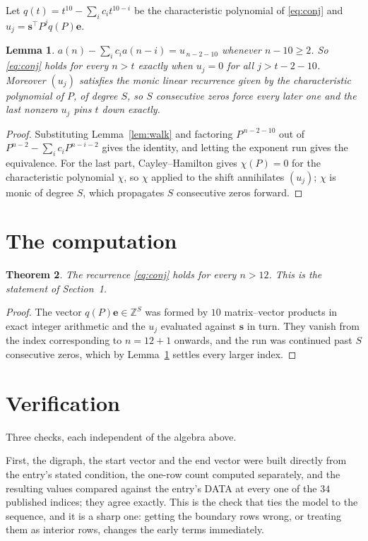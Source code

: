 \documentclass[11pt,a4paper]{article}
\theoremstyle{plain}
\newtheorem{theorem}{Theorem}
\newtheorem{lemma}[theorem]{Lemma}
\theoremstyle{definition}
\begin{document}
Let $q(t)=t^{10}-\sum_i c_i t^{10-i}$ be the characteristic polynomial of
\eqref{eq:conj} and $u_j=\mathbf{s}^{\!\top}P^{j}q(P)\mathbf{e}$.

\begin{lemma}\label{lem:crit}
$a(n)-\sum_i c_i a(n-i)=u_{\,n-2-10}$ whenever $n-10\ge2$. So \eqref{eq:conj}
holds for every $n>t$ exactly when $u_j=0$ for all $j>t-2-10$. Moreover $(u_j)$
satisfies the monic linear recurrence given by the characteristic polynomial of $P$, of
degree $S$, so $S$ consecutive zeros force every later one and the last nonzero $u_j$ pins
$t$ down exactly.
\end{lemma}

\begin{proof}
Substituting Lemma~\ref{lem:walk} and factoring $P^{\,n-2-10}$ out of
$P^{n-2}-\sum_i c_i P^{n-i-2}$ gives the identity, and letting the exponent run gives the
equivalence. For the last part, Cayley--Hamilton gives $\chi(P)=0$ for the characteristic
polynomial $\chi$, so $\chi$ applied to the shift annihilates $(u_j)$; $\chi$ is monic of
degree $S$, which propagates $S$ consecutive zeros forward.
\end{proof}

\section{The computation}

\begin{theorem}
The recurrence \eqref{eq:conj} holds for every $n>12$. This is the statement of
Section~1.
\end{theorem}

\begin{proof}
The vector $q(P)\mathbf{e}\in\mathbb{Z}^{S}$ was formed by $10$ matrix--vector
products in exact integer arithmetic and the $u_j$ evaluated against $\mathbf{s}$ in turn.
They vanish from the index corresponding to $n=12+1$ onwards, and the run was continued
past $S$ consecutive zeros, which by Lemma~\ref{lem:crit} settles every larger index.
\end{proof}

\section{Verification}

Three checks, each independent of the algebra above.

First, the digraph, the start vector and the end vector were built directly from the
entry's stated condition, the one-row count computed separately, and the resulting values
compared against the entry's DATA at every one of the $34$ published indices; they
agree exactly. This is the check that ties the model to the sequence, and it is a sharp one:
getting the boundary rows wrong, or treating them as interior rows, changes the early terms
immediately.
\end{document}
